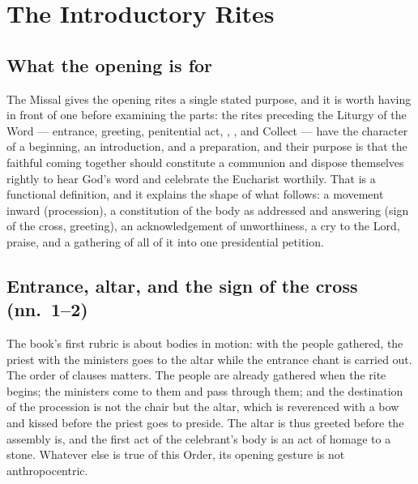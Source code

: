 \section{The Introductory Rites}

\subsection{What the opening is for}

The Missal gives the opening rites a single stated purpose, and it is worth having in front of
one before examining the parts: the rites preceding the Liturgy of the Word --- entrance,
greeting, penitential act, , , and Collect --- have the character of
a beginning, an introduction, and a preparation, and their purpose is that the faithful coming
together should constitute a communion and dispose themselves rightly to hear God's word and
celebrate the Eucharist worthily. That is a functional definition, and it explains the shape of what follows: a movement
inward (procession), a constitution of the body as addressed and answering (sign of the cross,
greeting), an acknowledgement of unworthiness, a cry to the Lord, praise, and a gathering of
all of it into one presidential petition.

\subsection{Entrance, altar, and the sign of the cross (nn.\ 1--2)}

The book's first rubric is about bodies in motion: with the people gathered, the priest with
the ministers goes to the altar while the entrance chant is carried out. The order of clauses
matters. The people are already gathered when the rite begins; the ministers come to them and
pass through them; and the destination of the procession is not the chair but the altar, which
is reverenced with a bow and kissed before the priest goes to preside. The altar is thus
greeted before the assembly is, and the first act of the celebrant's body is an act of homage
to a stone. Whatever else is true of this Order, its opening gesture is not anthropocentric.

